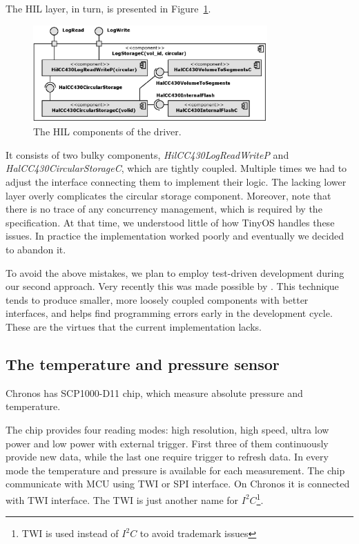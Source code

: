 The HIL layer, in turn, is presented in Figure~\ref{fig:log_storage_c}.
\begin{figure}[h]
  \centering
  \includegraphics[width=0.8\textwidth]{diagrams/log_storage_c.eps}
  \caption{The HIL components of the driver.}
  \label{fig:log_storage_c}
\end{figure}
It consists of two bulky components, \emph{HilCC430LogReadWriteP} and \emph{HalCC430CircularStorageC}, which are tightly coupled.
Multiple times we had to adjust the interface connecting them to implement their logic. The lacking lower layer overly complicates the circular storage component. Moreover, note that there is no trace of any concurrency management, which is required by the specification. At that time, we understood little of how TinyOS handles these issues. In practice the implementation worked poorly and eventually we decided to abandon it.

To avoid the above mistakes, we plan to employ test-driven development during our second approach. Very recently this was made possible by \cite{TOSMock}. This technique tends to produce smaller, more loosely coupled components with better interfaces, and helps find programming errors early in the development cycle. These are the virtues that the current implementation lacks.

\subsection{The temperature and pressure sensor}
Chronos has SCP1000-D11 chip, which measure absolute pressure and temperature.

The chip provides four reading modes: high resolution, high speed, ultra low power and low power with external trigger.
First three of them continuously provide new data, while the last one require trigger to refresh data.
In every mode the temperature and pressure is available for each measurement.
The chip communicate with MCU using TWI or SPI interface.
On Chronos it is connected with TWI interface.
The TWI is just another name for $I^2C$\footnote{TWI is used instead of $I^2C$ to avoid trademark issues}.

